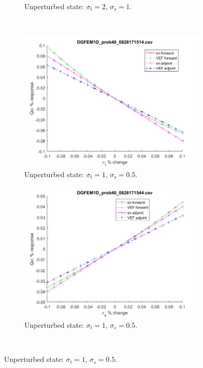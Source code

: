 \documentclass[12pt]{report}
\newcommand{\sigt}{\sigma_t}
\newcommand{\sigs}{\sigma_s}
\begin{document}
\begin{figure}[H]
\begin{subfigure}{.5\textwidth}
  \caption{Unperturbed state: $\sigt=2$, $\sigs=1$.}
  \label{fig:sfig4}
\end{subfigure}%
\\
\begin{subfigure}{.5\textwidth}
  \centering
  \includegraphics[width=.98\linewidth]{figures/40sigtSens.png}
  \caption{Unperturbed state: $\sigt=1$, $\sigs=0.5$.}
  \label{fig:sfig2}
\end{subfigure}%
\begin{subfigure}{.5\textwidth}
  \centering
  \includegraphics[width=.98\linewidth]{figures/40sigsSens.png}
  \caption{Unperturbed state: $\sigt=1$, $\sigs=0.5$.}
  \label{fig:sfig5}
\end{subfigure}%
\\

\end{figure}
\end{document}
